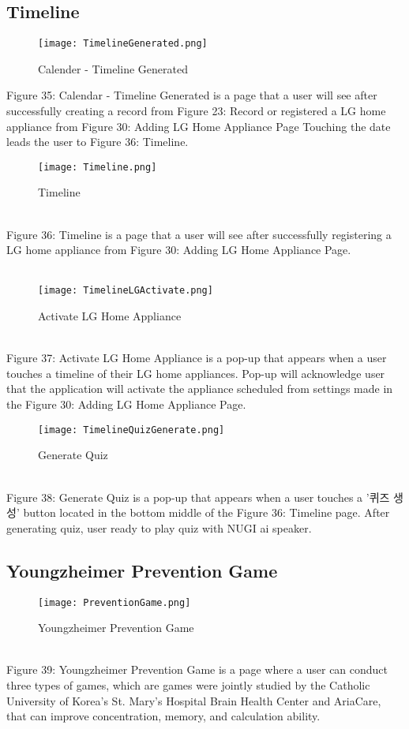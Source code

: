 \documentclass[conference]{IEEEtran}
\begin{document}
\subsection{Timeline}
\begin{figure}[h]
\centerline{\texttt{[image: TimelineGenerated.png]}}
\caption{Calender - Timeline Generated}
\label{fig}
\end{figure}
Figure 35: Calendar - Timeline Generated is a page that a user will see after successfully creating a record from Figure 23: Record or registered a LG home appliance from Figure 30: Adding LG Home Appliance Page Touching the date leads the user to Figure 36: Timeline.
\\
\begin{figure}[h]
\centerline{\texttt{[image: Timeline.png]}}
\caption{Timeline}
\label{fig}
\end{figure}
\\
Figure 36: Timeline is a page that a user will see after successfully registering a LG home appliance from Figure 30: Adding LG Home Appliance Page.
\\\\
\begin{figure}[h]
\centerline{\texttt{[image: TimelineLGActivate.png]}}
\caption{Activate LG Home Appliance}
\label{fig}
\end{figure}
\\
Figure 37: Activate LG Home Appliance is a pop-up that appears when a user touches a timeline of their LG home appliances. Pop-up will acknowledge user that the application will activate the appliance scheduled from settings made in the Figure 30: Adding LG Home Appliance Page.
\\
\begin{figure}[h]
\centerline{\texttt{[image: TimelineQuizGenerate.png]}}
\caption{Generate Quiz}
\label{fig}
\end{figure}
\\
Figure 38: Generate Quiz is a pop-up that appears when a user touches a '퀴즈 생성' button located in the bottom middle of the Figure 36: Timeline page. After generating quiz, user ready to play quiz with NUGI ai speaker.
\\
\clearpage
\subsection{Youngzheimer Prevention Game}
\begin{figure}[h]
\centerline{\texttt{[image: PreventionGame.png]}}
\caption{Youngzheimer Prevention Game}
\label{fig}
\end{figure}
\\
Figure 39: Youngzheimer Prevention Game is a page where a user can conduct three types of games, which are games were jointly studied by the Catholic University of Korea's St. Mary's Hospital Brain Health Center and AriaCare, that can improve concentration, memory, and calculation ability.\\
\end{document}
